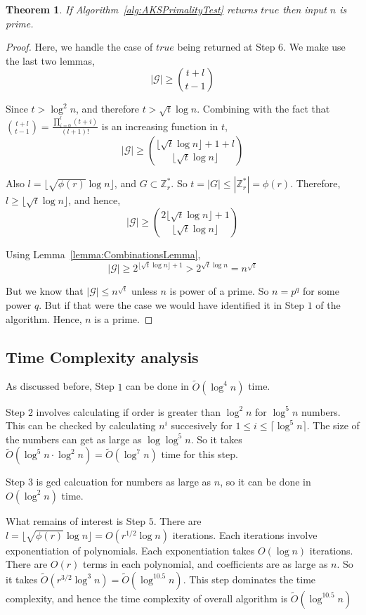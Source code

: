 \documentclass[11pt]{report}
\newtheorem{theorem}{Theorem}[section]
\begin{document}
\begin{theorem}
If Algorithm~\ref{alg:AKSPrimalityTest} returns $true$ then input $n$ is prime.
\end{theorem}
\begin{proof}
Here, we handle the case of $true$ being returned at Step $6$. We make use the last two lemmas,
\[|\mathcal{G}| \geq {{t+l} \choose {t-1}}\]

Since $t > \log^2 n$, and therefore $t > \sqrt t \log n$. Combining with the fact that ${{t+l} \choose {t-1}} = \frac{\prod_{i=0}^l{(t+i)}}{(l+1)!}$ is an increasing function in $t$,
\[|\mathcal{G}| \geq {{{\lfloor \sqrt t \log n \rfloor} + 1 + l} \choose {\lfloor \sqrt t \log n \rfloor}}\]

Also $l = \lfloor \sqrt{\phi(r)} \log n \rfloor$, and $G \subset \mathbb{Z}_r^{*}$. So $t = |G| \leq |\mathbb{Z}_r^{*}| = \phi(r)$. Therefore, $l \geq \lfloor \sqrt{t} \log{n} \rfloor$, and hence,
\[|\mathcal{G}| \geq {{2{\lfloor \sqrt t \log n \rfloor}+1} \choose {\lfloor \sqrt t \log n \rfloor}}\]

Using Lemma~\ref{lemma:CombinationsLemma},
\[|\mathcal{G}| \geq 2^{{\lfloor \sqrt t \log n \rfloor}+1} > 2^{\sqrt t \log n} = n^{\sqrt t}\]

But we know that $|\mathcal{G}| \leq n^{\sqrt t}$ unless $n$ is power of a prime. So $n = p^{q}$ for some power $q$. But if that were the case we would have identified it in Step $1$ of the algorithm. Hence, $n$ is a prime.
\end{proof}

\subsection{Time Complexity analysis}
As discussed before, Step $1$ can be done in $\tilde O(\log^4 n)$ time.

Step $2$ involves calculating if order is greater than $\log^2 n$ for $\log^5 n$ numbers. This can be checked by calculating $n^i$ succesively for $1 \leq i \leq \lceil \log^5 n \rceil$. The size of the numbers can get as large as $\log \log^5 n$. So it takes $\tilde O({\log^5 n} \cdot {\log^2 n}) = \tilde O(\log^7 n)$ time for this step.

Step $3$ is gcd calcuation for numbers as large as $n$, so it can be done in $O(\log^2 n)$ time.

What remains of interest is Step $5$. There are $l = \lfloor \sqrt{\phi(r)} \log n \rfloor = O(r^{1/2} \log n)$ iterations. Each iterations involve exponentiation of polynomials. Each exponentiation takes $O(\log n)$ iterations. There are $O(r)$ terms in each polynomial, and coefficients are as large as $n$. So it takes $\tilde O({r^{3/2} \log^3 n})= \tilde O(\log^{10.5}n)$. This step dominates the time complexity, and hence the time complexity of overall algorithm is $\tilde O(\log^{10.5}n)$
\end{document}

